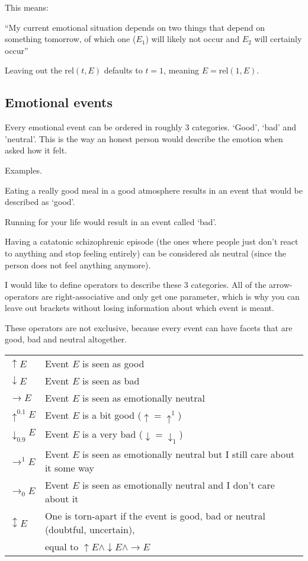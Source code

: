 \documentclass{scrartcl}
\begin{document}
This means:

``My current emotional situation depends on two things that depend on something tomorrow, of which one ($E_1$) will likely not
occur and $E_2$ will certainly occur''

Leaving out the $\textrm{rel}(t, E)$ defaults to $t = 1$, meaning $E = \textrm{rel}(1, E)$.

\subsection{Emotional events}

Every emotional event can be ordered in roughly 3 categories. `Good', `bad' and 'neutral'. This is the way an honest
person would describe the emotion when asked how it felt. 

Examples.

Eating a really good meal in a good atmosphere results in an event that would be described as `good'. 

Running for your life would result in an event called `bad'.

Having a catatonic schizophrenic episode (the ones where people just don't react to anything and stop feeling entirely)
can be considered als neutral (since the person does not feel anything anymore).

I would like to define operators to describe these 3 categories. All of the arrow-operators are right-associative and
only get one parameter, which is why you can leave out brackets without losing information about which event is meant.

These operators are not exclusive, because every event can have facets that are good, bad and neutral altogether.

\begin{tabular}{l|l}
	$\uparrow E$ & Event $E$ is seen as good \\
	$\downarrow E$ & Event $E$ is seen as bad \\
	$\rightarrow E$ & Event $E$ is seen as emotionally neutral \\
	$\uparrow^{0.1} E$ & Event $E$ is a bit good ($\uparrow = \uparrow^1$) \\
	$\downarrow_{0.9} E$ & Event $E$ is a very bad ($\downarrow = \downarrow_1$) \\
	$\rightarrow^{1} E$ & Event $E$ is seen as emotionally neutral but I still care about it some way\footnotemark \\
	$\rightarrow_{0} E$ & Event $E$ is seen as emotionally neutral and I don't care about it\footnotemark\\
	$\updownarrow E$ & One is torn-apart if the event is good, bad or neutral (doubtful, uncertain), \\
			 & equal to $\uparrow E \wedge \downarrow E \wedge \rightarrow E$
\end{tabular}
\end{document}
